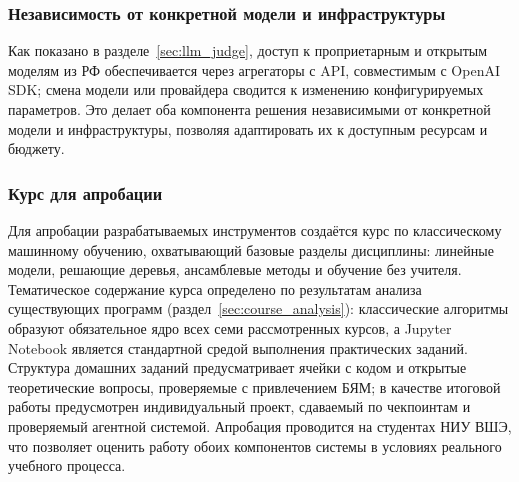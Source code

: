 \subsubsection*{Независимость от конкретной модели и инфраструктуры}

Как показано в разделе~\ref{sec:llm_judge}, доступ к проприетарным и
открытым моделям из РФ обеспечивается через агрегаторы с API,
совместимым с OpenAI SDK; смена модели или провайдера сводится к
изменению конфигурируемых параметров. Это делает
оба компонента решения независимыми от конкретной модели и
инфраструктуры, позволяя адаптировать их к доступным ресурсам и
бюджету.

\subsubsection*{Курс для апробации}

Для апробации разрабатываемых инструментов создаётся курс по
классическому машинному обучению, охватывающий базовые разделы
дисциплины: линейные модели, решающие деревья, ансамблевые методы и
обучение без учителя. Тематическое содержание курса определено по
результатам анализа существующих программ
(раздел~\ref{sec:course_analysis}): классические алгоритмы образуют
обязательное ядро всех семи рассмотренных курсов, а Jupyter Notebook
является стандартной средой выполнения практических заданий. Структура
домашних заданий предусматривает ячейки с кодом и открытые
теоретические вопросы, проверяемые с привлечением БЯМ; в качестве
итоговой работы предусмотрен индивидуальный проект, сдаваемый по
чекпоинтам и проверяемый агентной системой. Апробация проводится на
студентах НИУ ВШЭ, что позволяет оценить работу обоих компонентов
системы в условиях реального учебного процесса.